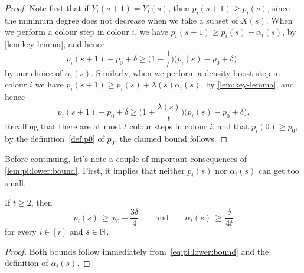 \begin{proof}
  Note first that if \(Y_i(s+1) = Y_i(s)\), then \(p_i(s+1) \ge p_i(s)\), since the minimum degree does not decrease when we take a subset of \(X(s)\). When we perform a colour step in colour \(i\), %
  we have \(p_i(s+1) \ge p_i(s) - \alpha_i(s)\), by \autoref{lem:key-lemma}, and hence
  \begin{equation*}
    p_i(s+1) - p_0 + \delta \ge \bigg( 1 - \frac{1}{t} \bigg) \big( p_i(s) - p_0 + \delta \big),
  \end{equation*}
  by our choice of \(\alpha_i(s)\). Similarly, when we perform a density-boost step in colour \(i\)  
  we have \(p_i(s+1) \ge p_i(s) + \lambda(s) \alpha_i(s)\), by \autoref{lem:key-lemma}, and hence
  \begin{equation*}
    p_i(s+1) - p_0 + \delta \ge \bigg( 1 + \frac{\lambda(s)}{t} \bigg) \big( p_i(s) - p_0 + \delta \big).
  \end{equation*}
  Recalling that there are at most \(t\) colour steps in colour \(i\), and that \(p_i(0) \ge p_0\), by the definition~\eqref{def:p0} of \(p_0\), the claimed bound follows. 
\end{proof}

Before continuing, let's note a couple of important consequences of \autoref{lem:pi:lower:bound}. First, it implies that neither \(p_i(s)\) nor \(\alpha_i(s)\) can get too small. 

\begin{lemma}
  \label{lem:pi:min} %
  If \(t \ge 2\), then 
  \begin{equation*}
    p_i(s) \, \ge \, p_0 - \frac{3\delta}{4} \qquad \text{and} \qquad \alpha_i(s) \, \ge \, \frac{\delta}{4t}
  \end{equation*}
  for every \(i \in [r]\) and \(s \in \mathbb{N}\). 
\end{lemma}
%
\begin{proof}
  Both bounds follow immediately from~\eqref{eq:pi:lower:bound} and the definition of \(\alpha_i(s)\). 
\end{proof}

